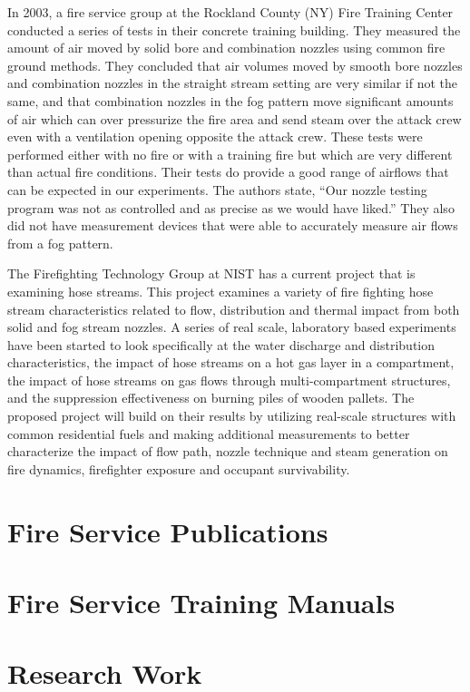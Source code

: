 \documentclass[12pt,oneside]{book}
\begin{document}
In 2003, a fire service group at the Rockland County (NY) Fire Training Center conducted a series of tests in their concrete training building. They measured the amount of air moved by solid bore and combination nozzles using common fire ground methods. They concluded that air volumes moved by smooth bore nozzles and combination nozzles in the straight stream setting are very similar if not the same, and that combination nozzles in the fog pattern move significant amounts of air which can over pressurize the fire area and send steam over the attack crew even with a ventilation opening opposite the attack crew. These tests were performed either with no fire or with a training fire but which are very different than actual fire conditions. Their tests do provide a good range of airflows that can be expected in our experiments. The authors state, “Our nozzle testing program was not as controlled and as precise as we would have liked.” They also did not have measurement devices that were able to accurately measure air flows from a fog pattern.  

The Firefighting Technology Group at NIST has a current project that is examining hose streams. This project examines a variety of fire fighting hose stream characteristics related to flow, distribution and thermal impact from both solid and fog stream nozzles. A series of real scale, laboratory based experiments have been started to look specifically at the water discharge and distribution characteristics, the impact of hose streams on a hot gas layer in a compartment, the impact of hose streams on gas flows through multi-compartment structures, and the suppression effectiveness on burning piles of wooden pallets. The proposed project will build on their results by utilizing real-scale structures with common residential fuels and making additional measurements to better characterize the impact of flow path, nozzle technique and steam generation on fire dynamics, firefighter exposure and occupant survivability.

\section{Fire Service Publications}

\section{Fire Service Training Manuals}

\section{Research Work}
\end{document}
